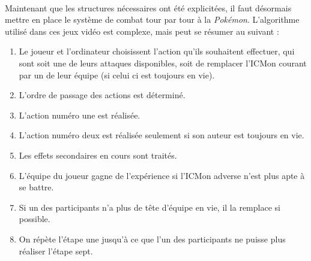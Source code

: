 \documentclass[12pt,a4paper, twoside]{article}
\begin{document}
        \paragraph{} Maintenant que les structures nécessaires ont été explicitées, il faut désormais mettre en place le système de combat tour par tour à la \emph{Pokémon}. L'algorithme utilisé dans ces jeux vidéo est complexe, mais peut se résumer au suivant :\\
        \begin{enumerate}
            \item Le joueur et l'ordinateur choisissent l'action qu'ils souhaitent effectuer, qui sont soit une de leurs attaques disponibles, soit de remplacer l'ICMon courant par un de leur équipe (si celui ci est toujours en vie).
            \item L'ordre de passage des actions est déterminé.
            \item L'action numéro une est réalisée.
            \item L'action numéro deux est réalisée seulement si son auteur est toujours en vie.
            \item Les effets secondaires en cours sont traités.
            \item L'équipe du joueur gagne de l'expérience si l'ICMon adverse n'est plus apte à se battre.
            \item Si un des participants n'a plus de tête d'équipe en vie, il la remplace si possible.
            \item On répète l'étape une jusqu'à ce que l'un des participants ne puisse plus réaliser l'étape sept.
        \end{enumerate}
\end{document}
